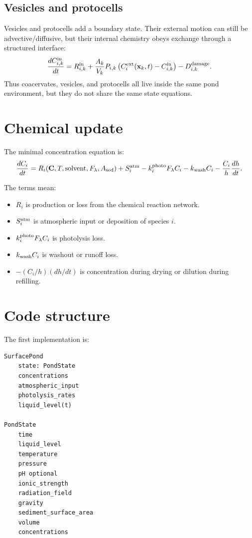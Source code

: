 \documentclass[11pt]{article}
\begin{document}
\subsection{Vesicles and protocells}

Vesicles and protocells add a boundary state. Their external motion can still
be advective/diffusive, but their internal chemistry obeys exchange through a
structured interface:
\begin{equation}
\frac{d C_{i,k}^{\rm in}}{dt}
=
R_{i,k}^{\rm in}
+
\frac{A_k}{V_k}
P_{i,k}
\left(
C_i^{\rm ext}(\mathbf{x}_k,t)
-
C_{i,k}^{\rm in}
\right)
-
D_{i,k}^{\rm damage}.
\end{equation}
Thus coacervates, vesicles, and protocells all live inside the same pond
environment, but they do not share the same state equations.

\section{Chemical update}

The minimal concentration equation is:
\begin{equation}
\frac{dC_i}{dt}
=
R_i(\mathbf{C},T,\mathrm{solvent},F_{\lambda},A_{\rm sed})
+
S_i^{\rm atm}
-
k_{i}^{\rm photo}F_{\lambda}C_i
-
k_{\rm wash}C_i
-
\frac{C_i}{h}\frac{dh}{dt}.
\end{equation}

The terms mean:
\begin{itemize}
  \item $R_i$ is production or loss from the chemical reaction network.
  \item $S_i^{\rm atm}$ is atmospheric input or deposition of species $i$.
  \item $k_i^{\rm photo}F_{\lambda}C_i$ is photolysis loss.
  \item $k_{\rm wash}C_i$ is washout or runoff loss.
  \item $-(C_i/h)(dh/dt)$ is concentration during drying or dilution during
  refilling.
\end{itemize}

\section{Code structure}

The first implementation is:
\begin{verbatim}
SurfacePond
    state: PondState
    concentrations
    atmospheric_input
    photolysis_rates
    liquid_level(t)

PondState
    time
    liquid_level
    temperature
    pressure
    pH optional
    ionic_strength
    radiation_field
    gravity
    sediment_surface_area
    volume
    concentrations
\end{verbatim}
\end{document}
